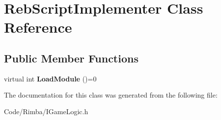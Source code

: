 \hypertarget{class_reb_script_implementer}{}\section{Reb\+Script\+Implementer Class Reference}
\label{class_reb_script_implementer}
\subsection*{Public Member Functions}
\begin{DoxyCompactItemize}
\item 
virtual int {\bfseries Load\+Module} ()=0\hypertarget{class_reb_script_implementer_ab3393d958fd02c888970adfea128d437}{}\label{class_reb_script_implementer_ab3393d958fd02c888970adfea128d437}

\end{DoxyCompactItemize}


The documentation for this class was generated from the following file\+:\begin{DoxyCompactItemize}
\item 
Code/\+Rimba/I\+Game\+Logic.\+h\end{DoxyCompactItemize}
